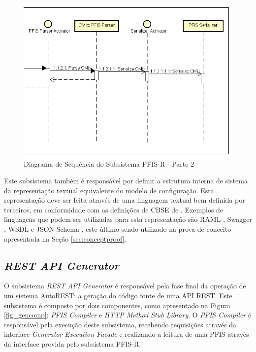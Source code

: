 \begin{figure}[htb]
    \begin{center}
        \includegraphics[scale=0.59]{imagens/PFIS_Reader_Sequence_Diagram_2.png}
    \end{center}
	\caption{\label{fig_pfisrseq2}Diagrama de Sequência do Subsistema PFIS-R - Parte 2}
\end{figure}

Este subsistema também é responsável por definir a estrutura interna de sistema da representação textual equivalente do modelo de configuração. Esta representação deve ser feita através de uma linguagem textual bem definida por terceiros, em conformidade com as definições de CBSE de . Exemplos de linguagens que podem ser utilizadas para esta representação são RAML \cite{RAML}, Swagger \cite{SWAGGER}, WSDL \cite{BOOTH:2005} e JSON Schema \cite{PEZOA:2016}, este último sendo utilizado na prova de conceito apresentada na Seção \ref{sec:conceptproof}.


\subsection{\textit{REST API Generator}}

O subsistema \textit{REST API Generator} é responsável pela fase final da operação de um sistema AutoREST: a geração do código fonte de uma API REST. Este subsistema é composto por dois componentes, como apresentado na Figura \ref{fig_gencomp}: \textit{PFIS Compiler} e \textit{HTTP Method Stub Library}. O \textit{PFIS Compiler} é responsável pela execução deste subsistema, recebendo requisições através da interface \textit{Generator Execution Facade} e realizando a leitura de uma PFIS através da interface provida pelo subsistema PFIS-R.

